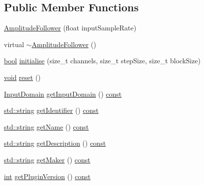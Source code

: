\subsection*{Public Member Functions}
\begin{DoxyCompactItemize}
\item 
\hyperlink{class_amplitude_follower_a29eaeffc353da2614ae508abcd0ab63f}{Amplitude\+Follower} (float input\+Sample\+Rate)
\item 
virtual \hyperlink{class_amplitude_follower_aa78f98539ad3a1b08691a99b32035b2d}{$\sim$\+Amplitude\+Follower} ()
\item 
\hyperlink{mac_2config_2i386_2lib-src_2libsoxr_2soxr-config_8h_abb452686968e48b67397da5f97445f5b}{bool} \hyperlink{class_amplitude_follower_aeb727e44ee8ad1aceb90964d20f8d90d}{initialise} (size\+\_\+t channels, size\+\_\+t step\+Size, size\+\_\+t block\+Size)
\item 
\hyperlink{sound_8c_ae35f5844602719cf66324f4de2a658b3}{void} \hyperlink{class_amplitude_follower_acebd835e80e84669df078fbd7591d8f7}{reset} ()
\item 
\hyperlink{class_vamp_1_1_plugin_a39cb7649d6dcc20e4cb1640cd55907bc}{Input\+Domain} \hyperlink{class_amplitude_follower_afc07a389b5f922b944b0350fd232d2eb}{get\+Input\+Domain} () \hyperlink{getopt1_8c_a2c212835823e3c54a8ab6d95c652660e}{const} 
\item 
\hyperlink{test__lib_f_l_a_c_2format_8c_ab02026ad0de9fb6c1b4233deb0a00c75}{std\+::string} \hyperlink{class_amplitude_follower_afe7576af95c8fcc7f5bad42eec9f9f29}{get\+Identifier} () \hyperlink{getopt1_8c_a2c212835823e3c54a8ab6d95c652660e}{const} 
\item 
\hyperlink{test__lib_f_l_a_c_2format_8c_ab02026ad0de9fb6c1b4233deb0a00c75}{std\+::string} \hyperlink{class_amplitude_follower_a7cfed00bc9d96ba6c709b69ab6a40594}{get\+Name} () \hyperlink{getopt1_8c_a2c212835823e3c54a8ab6d95c652660e}{const} 
\item 
\hyperlink{test__lib_f_l_a_c_2format_8c_ab02026ad0de9fb6c1b4233deb0a00c75}{std\+::string} \hyperlink{class_amplitude_follower_a6f0f2fea1fdb4b51e688edfe859d5062}{get\+Description} () \hyperlink{getopt1_8c_a2c212835823e3c54a8ab6d95c652660e}{const} 
\item 
\hyperlink{test__lib_f_l_a_c_2format_8c_ab02026ad0de9fb6c1b4233deb0a00c75}{std\+::string} \hyperlink{class_amplitude_follower_a44fc43838f203f58bc2ce6e3cb2b03dd}{get\+Maker} () \hyperlink{getopt1_8c_a2c212835823e3c54a8ab6d95c652660e}{const} 
\item 
\hyperlink{xmltok_8h_a5a0d4a5641ce434f1d23533f2b2e6653}{int} \hyperlink{class_amplitude_follower_a8a5d7a834eb996d517c51f84b2a72250}{get\+Plugin\+Version} () \hyperlink{getopt1_8c_a2c212835823e3c54a8ab6d95c652660e}{const} 

\end{DoxyCompactItemize}
